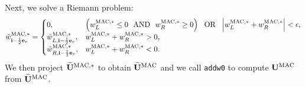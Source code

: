 Next, we solve a Riemann problem:
\begin{equation}
\tilde{w}_{{\bf i}-\frac{1}{2}{\bf e}_r}^{\rm MAC,*} =
\begin{cases}
0, & \left(w_L^{\rm MAC,*} \le 0 ~~ {\rm AND} ~~ w_R^{\rm MAC,*} \ge 0\right) ~~ {\rm OR} ~~ \left|w_L^{\rm MAC,*} + w_R^{\rm MAC,*}\right| < \epsilon, \\
\tilde{w}_{L,{\bf i}-\frac{1}{2}{\bf e}_r}^{\rm MAC,*}, & w_L^{\rm MAC,*} + w_R^{\rm MAC,*} > 0, \\
\tilde{w}_{R,{\bf i}-\frac{1}{2}{\bf e}_r}^{\rm MAC,*}, & w_L^{\rm MAC,*} + w_R^{\rm MAC,*} < 0. 
\end{cases}
\end{equation}
We then project $\widetilde{{\bf U}}^{\rm MAC,*}$ to obtain $\widetilde{{\bf U}}^{\rm MAC}$ and we call
{\tt addw0} to compute ${\bf U}^{\rm MAC}$ from $\widetilde{{\bf U}}^{\rm MAC}$.

\cleardoublepage

